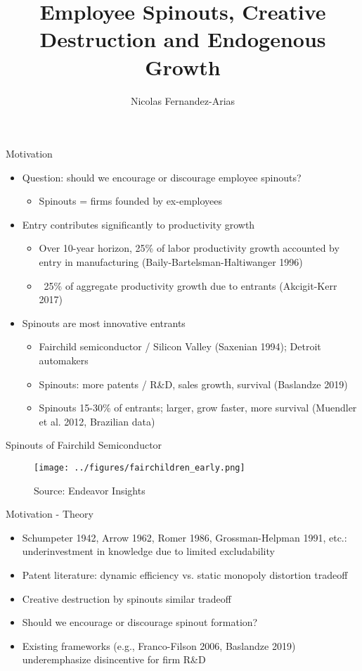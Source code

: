 \documentclass[english,usenames,dvipsnames]{beamer}
\title{Employee Spinouts, Creative Destruction and Endogenous Growth}
\author{Nicolas Fernandez-Arias}
\begin{document}
\maketitle

\begin{frame}{Motivation}
\begin{itemize}
	\item Question: should we encourage or discourage employee spinouts? 
	\begin{itemize}
		\item Spinouts = firms founded by ex-employees
	\end{itemize}
	\item Entry contributes significantly to productivity growth
	\begin{itemize}
		\item Over 10-year horizon, 25\% of labor productivity growth accounted by entry in manufacturing (Baily-Bartelsman-Haltiwanger 1996)
		\item ~25\% of aggregate productivity growth due to entrants (Akcigit-Kerr 2017)
	\end{itemize}
	\item Spinouts are most innovative entrants
	\begin{itemize}
		\item Fairchild semiconductor / Silicon Valley (Saxenian 1994); Detroit automakers
		\item Spinouts: more patents / R\&D, sales growth, survival (Baslandze 2019) 
		\item Spinouts 15-30\% of entrants; larger, grow faster, more survival (Muendler et al. 2012, Brazilian data)
	\end{itemize}
\end{itemize}
\end{frame}

\begin{frame}{Spinouts of Fairchild Semiconductor}
\begin{figure}
	\texttt{[image: ../figures/fairchildren\_early.png]}
	\caption{Source: Endeavor Insights}
\end{figure}
\end{frame}

\begin{frame}{Motivation - Theory}
\label{theory_big_picture}
\begin{itemize}
	\item Schumpeter 1942, Arrow 1962, Romer 1986, Grossman-Helpman 1991, etc.: \alert{underinvestment} in knowledge due to \alert{limited excludability}
	\item Patent literature: dynamic efficiency vs. static monopoly distortion tradeoff
	\item Creative destruction by spinouts similar tradeoff
	\item Should we encourage or discourage spinout formation?
	\item Existing frameworks (e.g., Franco-Filson 2006, Baslandze 2019) underemphasize disincentive for firm R\&D 
\end{itemize}
\end{frame}
\end{document}
